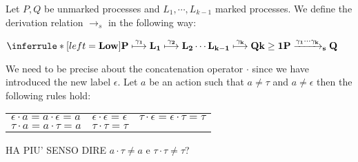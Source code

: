   
\begin{definition}\label{low}
  Let $P, Q$ be unmarked processes and $L_{1}, \cdots, L_{k-1}$ marked processes. We define the derivation relation $\rightarrow_{s}$ in the following way:
  \begin{center}
    $\inferrule* [left=\bf{Low}]{
	P \stackrel{\gamma_{1}}{\longmapsto} L_{1} \stackrel{\gamma_{2}}{\longmapsto} L_{2} \cdots L_{k-1} \stackrel{\gamma_{k}}{\longmapsto} Q
      \\
	k\geq 1
    }{
      P \xrightarrow{\gamma_{1} \cdots \gamma_{k}}_{s}  Q
    }$
  \end{center}
  We need to be precise about the concatenation operator $\cdot$ since we have introduced the new label $\epsilon$. Let $a$ be an action such that $a\neq \tau$ and $a\neq \epsilon$ then the following rules hold:
  \begin{center}
      \begin{tabular}{lll}
	  $\epsilon \cdot a = a \cdot \epsilon = a$
	&
	  $\epsilon \cdot \epsilon = \epsilon$
	&
	  $\tau \cdot \epsilon = \epsilon \cdot \tau = \tau$
	\\
	  $\tau \cdot a = a \cdot \tau = a$
	&
	  $\tau \cdot \tau = \tau$
	&
      \end{tabular}
  \end{center}

  HA PIU' SENSO DIRE $a \cdot \tau \neq a$ e $\tau \cdot \tau \neq \tau$?

\end{definition}

